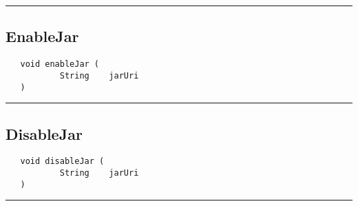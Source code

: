 \rule{15cm}{2pt}
\subsection{EnableJar}
\label{Api:EnableJar}
\begin{verbatim}
   void enableJar (
           String    jarUri
   )
\end{verbatim}



\rule{15cm}{2pt}
\subsection{DisableJar}
\label{Api:DisableJar}
\begin{verbatim}
   void disableJar (
           String    jarUri
   )
\end{verbatim}



\rule{15cm}{2pt}
